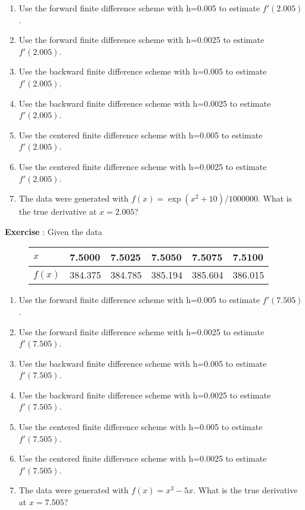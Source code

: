 \documentclass[a4paper,12pt,openany,notitlepage]{book}
\newcounter{num_exercice}
\newcommand{\exercice}
    {   \par
        \stepcounter{num_exercice}%
        \noindent
        \textbf{Exercise \arabic{num_exercice}}:
        \quad
    }
\begin{document}
\begin{enumerate}[label=\alph*)]
	\item Use the forward finite difference scheme with h=0.005 to estimate $f'(2.005)$.
	
	\item Use the forward finite difference scheme with h=0.0025 to estimate $f'(2.005)$.

	\item Use the backward finite difference scheme with h=0.005 to estimate $f'(2.005)$.

	\item Use the backward finite difference scheme with h=0.0025 to estimate $f'(2.005)$.
	
	\item Use the centered finite difference scheme with h=0.005 to estimate $f'(2.005)$.

	\item Use the centered finite difference scheme with h=0.0025 to estimate $f'(2.005)$.

	\item The data were generated with $f(x)=\exp(x^2 + 10)/1000000$. What is the true derivative at $x=2.005$?
\end{enumerate}


\exercice{Given the data}
\begin{figure}[h]
\begin{tabular}{l|lllll}
$x$    & 7.5000   & 7.5025   & 7.5050   & 7.5075   & 7.5100 \\  \hline
$f(x)$ & 384.375 & 384.785 & 385.194 & 385.604 & 386.015
\end{tabular}
\end{figure}          

\begin{enumerate}[label=\alph*)]
	\item Use the forward finite difference scheme with h=0.005 to estimate $f'(7.505)$.
	
	\item Use the forward finite difference scheme with h=0.0025 to estimate $f'(7.505)$.

	\item Use the backward finite difference scheme with h=0.005 to estimate $f'(7.505)$.

	\item Use the backward finite difference scheme with h=0.0025 to estimate $f'(7.505)$.
	
	\item Use the centered finite difference scheme with h=0.005 to estimate $f'(7.505)$.

	\item Use the centered finite difference scheme with h=0.0025 to estimate $f'(7.505)$.

	\item The data were generated with $f(x)=x^3 - 5x$. What is the true derivative at $x=7.505$?
\end{enumerate}
\end{document}
